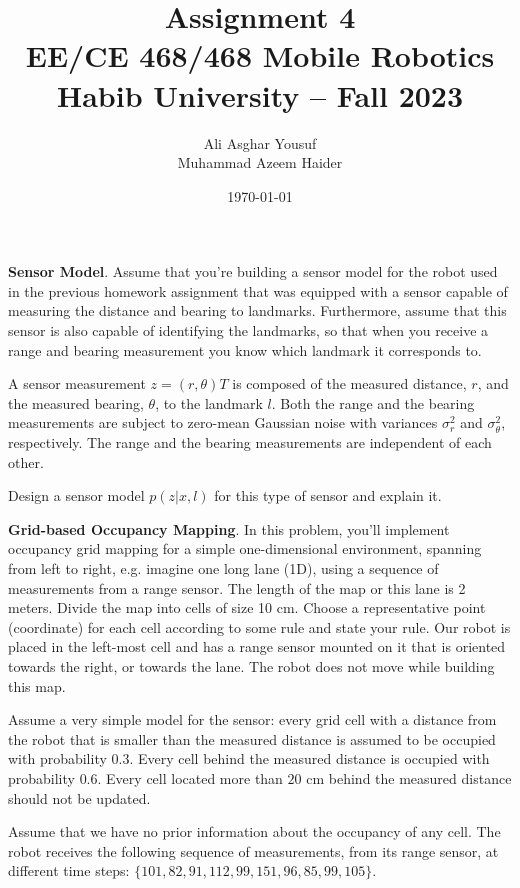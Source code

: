 \documentclass[answers]{exam}
\title{Assignment 4\\ EE/CE 468/468 Mobile Robotics\\ Habib University -- Fall 2023}
\author{Ali Asghar Yousuf \\ Muhammad Azeem Haider }
\date{\today}
\begin{document}
\maketitle

\begin{questions}
    \question[25]
    \textbf{Sensor Model}. Assume that you're building a sensor model for the robot used in the previous homework assignment that was equipped with a sensor capable of measuring the distance
    and bearing to landmarks. Furthermore, assume that this sensor is also capable of identifying
    the landmarks, so that when you receive a range and bearing measurement you know which
    landmark it corresponds to.

    A sensor measurement $z = (r, \theta)T$ is composed of the measured distance, $r$, and the measured
    bearing, $\theta$, to the landmark $l$. Both the range and the bearing measurements are subject to
    zero-mean Gaussian noise with variances $\sigma_r^2$ and $\sigma_\theta^2$, respectively. The range and the bearing
    measurements are independent of each other.
    
    Design a sensor model $p(z|x, l)$ for this type of sensor and explain it.
    
    \begin{solution}
    \end{solution}

    \question[25]
    \textbf{Grid-based Occupancy Mapping}. In this problem, you'll implement occupancy grid mapping
    for a simple one-dimensional environment, spanning from left to right, e.g. imagine one long
    lane (1D), using a sequence of measurements from a range sensor. The length of the map or
    this lane is 2 meters. Divide the map into cells of size 10 cm. Choose a representative point
    (coordinate) for each cell according to some rule and state your rule. Our robot is placed in
    the left-most cell and has a range sensor mounted on it that is oriented towards the right, or
    towards the lane. The robot does not move while building this map.

    Assume a very simple model for the sensor: every grid cell with a distance from the robot
    that is smaller than the measured distance is assumed to be occupied with probability $0.3$.
    Every cell behind the measured distance is occupied with probability $0.6$. Every cell located
    more than $20$ cm behind the measured distance should not be updated.

    Assume that we have no prior information about the occupancy of any cell. The robot receives
    the following sequence of measurements, from its range sensor, at different time steps:
    $\{101, 82, 91, 112, 99, 151, 96, 85, 99, 105\}$.


\end{questions}
\end{document}
